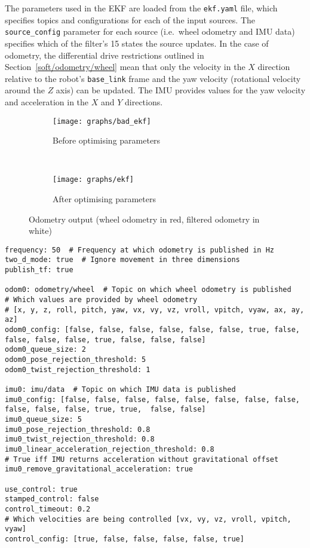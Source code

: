 The parameters used in the EKF are loaded from the \verb|ekf.yaml| file, which
specifies topics and configurations for each of the input sources. The
\verb|source_config| parameter for each source (i.e.\ wheel odometry and IMU data)
specifies which of the filter's 15 states the source updates. In the case of
odometry, the differential drive restrictions outlined in
Section~\ref{soft/odometry/wheel} mean that only the velocity in the $X$
direction relative to the robot's \verb|base_link| frame
and the yaw velocity (rotational velocity around the $Z$ axis) can be updated.
The IMU provides values for the yaw velocity and acceleration in the $X$ and
$Y$ directions.



\begin{figure}[!ht]
  \centering
  \begin{subfigure}[b]{0.4\textwidth}
    \texttt{[image: graphs/bad\_ekf]}
    \caption{Before optimising parameters}
    \label{fig:ekf_output/bad}
  \end{subfigure}
  ~
  \begin{subfigure}[b]{0.4\textwidth}
    \texttt{[image: graphs/ekf]}
    \caption{After optimising parameters}
    \label{fig:ekf_output/good}
  \end{subfigure}
  \caption[Odometry output]{Odometry output (wheel odometry in red, filtered odometry in white)}\label{fig:ekf_output}
\end{figure}



\begin{lstlisting}[caption={EKF YAML file}, label={lst:ekf_yaml}, style=yaml]
frequency: 50  # Frequency at which odometry is published in Hz
two_d_mode: true  # Ignore movement in three dimensions
publish_tf: true

odom0: odometry/wheel  # Topic on which wheel odometry is published
# Which values are provided by wheel odometry
# [x, y, z, roll, pitch, yaw, vx, vy, vz, vroll, vpitch, vyaw, ax, ay, az]
odom0_config: [false, false, false, false, false, false, true, false, false, false, false, true, false, false, false]
odom0_queue_size: 2
odom0_pose_rejection_threshold: 5
odom0_twist_rejection_threshold: 1

imu0: imu/data  # Topic on which IMU data is published
imu0_config: [false, false, false, false, false, false, false, false, false, false, false, true, true,  false, false]
imu0_queue_size: 5
imu0_pose_rejection_threshold: 0.8
imu0_twist_rejection_threshold: 0.8
imu0_linear_acceleration_rejection_threshold: 0.8
# True iff IMU returns acceleration without gravitational offset
imu0_remove_gravitational_acceleration: true

use_control: true
stamped_control: false
control_timeout: 0.2
# Which velocities are being controlled [vx, vy, vz, vroll, vpitch, vyaw]
control_config: [true, false, false, false, false, true]
\end{lstlisting}





